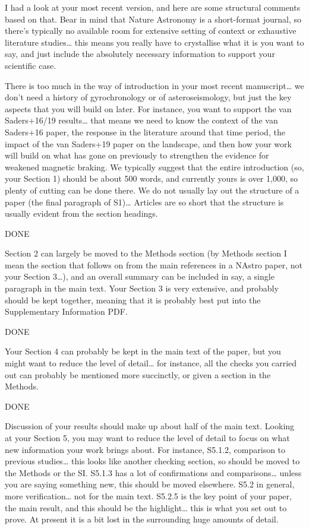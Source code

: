 I had a look at your most recent version, and here are some structural comments based on that. Bear in mind that Nature Astronomy is a short-format journal, so there’s typically no available room for extensive setting of context or exhaustive literature studies… this means you really have to crystallise what it is you want to say, and just include the absolutely necessary information to support your scientific case.

 

There is too much in the way of introduction in your most recent manuscript… we don’t need a history of gyrochronology or of asteroseismology, but just the key aspects that you will build on later. For instance, you want to support the van Saders+16/19 results… that means we need to know the context of the van Saders+16 paper, the response in the literature around that time period, the impact of the van Saders+19 paper on the landscape, and then how your work will build on what has gone on previously to strengthen the evidence for weakened magnetic braking. We typically suggest that the entire introduction (so, your Section 1) should be about 500 words, and currently yours is over 1,000, so plenty of cutting can be done there. We do not usually lay out the structure of a paper (the final paragraph of S1)… Articles are so short that the structure is usually evident from the section headings.

DONE
 

Section 2 can largely be moved to the Methods section (by Methods section I mean the section that follows on from the main references in a NAstro paper, not your Section 3…), and an overall summary can be included in say, a single paragraph in the main text. Your Section 3 is very extensive, and probably should be kept together, meaning that it is probably best put into the Supplementary Information PDF.    

DONE
 

Your Section 4 can probably be kept in the main text of the paper, but you might want to reduce the level of detail… for instance, all the checks you carried out can probably be mentioned more succinctly, or given a section in the Methods.

DONE 

Discussion of your results should make up about half of the main text. Looking at your Section 5, you may want to reduce the level of detail to focus on what new information your work brings about. For instance, S5.1.2, comparison to previous studies… this looks like another checking section, so should be moved to the Methods or the SI. S5.1.3 has a lot of confirmations and comparisons… unless you are saying something new, this should be moved elsewhere. S5.2 in general, more verification… not for the main text. S5.2.5 is the key point of your paper, the main result, and this should be the highlight… this is what you set out to prove. At present it is a bit lost in the surrounding huge amounts of detail.

